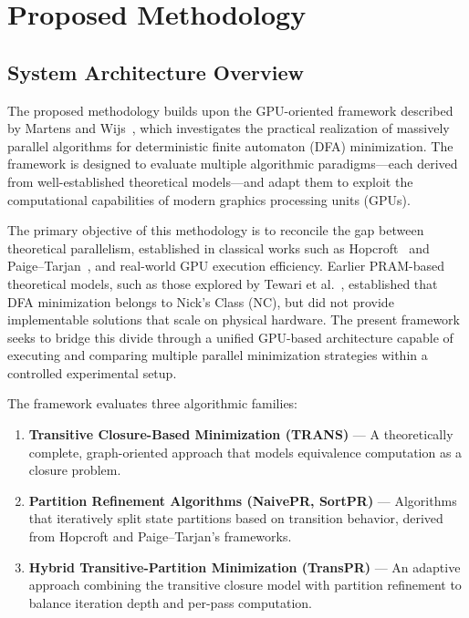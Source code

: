 \chapter{Proposed Methodology}
\label{chap:proposed_methodology}

\section{System Architecture Overview}

The proposed methodology builds upon the GPU-oriented framework described by Martens and Wijs~\cite{martenswijs2024}, which investigates the practical realization of massively parallel algorithms for deterministic finite automaton (DFA) minimization. The framework is designed to evaluate multiple algorithmic paradigms—each derived from well-established theoretical models—and adapt them to exploit the computational capabilities of modern graphics processing units (GPUs). 

The primary objective of this methodology is to reconcile the gap between theoretical parallelism, established in classical works such as Hopcroft~\cite{hopcroft1971} and Paige–Tarjan~\cite{paigetarjan1987}, and real-world GPU execution efficiency. Earlier PRAM-based theoretical models, such as those explored by Tewari et al.~\cite{tewari2002}, established that DFA minimization belongs to Nick’s Class (NC), but did not provide implementable solutions that scale on physical hardware. The present framework seeks to bridge this divide through a unified GPU-based architecture capable of executing and comparing multiple parallel minimization strategies within a controlled experimental setup.

The framework evaluates three algorithmic families:
\begin{enumerate}
    \item \textbf{Transitive Closure-Based Minimization (TRANS)} — A theoretically complete, graph-oriented approach that models equivalence computation as a closure problem.
    \item \textbf{Partition Refinement Algorithms (NaivePR, SortPR)} — Algorithms that iteratively split state partitions based on transition behavior, derived from Hopcroft and Paige–Tarjan’s frameworks.
    \item \textbf{Hybrid Transitive-Partition Minimization (TransPR)} — An adaptive approach combining the transitive closure model with partition refinement to balance iteration depth and per-pass computation.
\end{enumerate}

